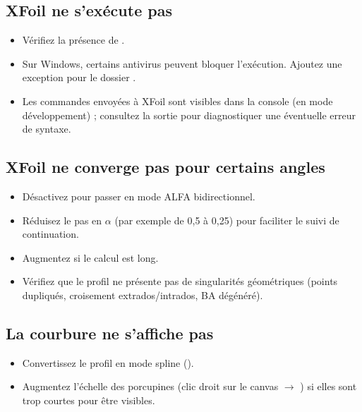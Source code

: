 \subsection*{XFoil ne s'exécute pas}

\begin{itemize}
    \item Vérifiez la présence de .
    \item Sur Windows, certains antivirus peuvent bloquer
        l'exécution. Ajoutez une exception pour le dossier
        .
    \item Les commandes envoyées à XFoil sont visibles dans la
        console (en mode développement) ; consultez la sortie
        pour diagnostiquer une éventuelle erreur de syntaxe.
\end{itemize}

\subsection*{XFoil ne converge pas pour certains angles}

\begin{itemize}
    \item Désactivez  pour passer en mode ALFA
        bidirectionnel.
    \item Réduisez le pas en $\alpha$ (par exemple de 0{,}5\textdegree{} à
        0{,}25\textdegree{}) pour faciliter le suivi de continuation.
    \item Augmentez  si le calcul est long.
    \item Vérifiez que le profil ne présente pas de singularités
        géométriques (points dupliqués, croisement extrados/intrados,
        BA dégénéré).
\end{itemize}

\subsection*{La courbure ne s'affiche pas}

\begin{itemize}
    \item Convertissez le profil en mode spline
        ().
    \item Augmentez l'échelle des porcupines (clic droit sur le
        canvas $\rightarrow$ ) si
        elles sont trop courtes pour être visibles.
\end{itemize}

